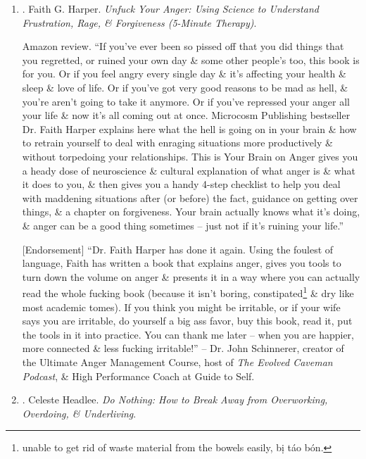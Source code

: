 \documentclass{article}
\begin{document}
\begin{enumerate}
	{\sf About the Author.} Dr. {\sc Faith G. Harper}, ACS, ACN, holds postdoctoral certifications in sexology \& applied clinical nutrition \& is trained in yoga, meditation, breathwork, mindful movement, \& all of those other forms of care that make most people avoid her at parties. In the past, she has worked in academia, community mental health, \& private practice as a licensed professional counselor. She maintains a connection with academia through he work with the Society of Indian Psychologists. She lives in San Antonio, TX, with her amazing friends \& family \& terrible rescue cats. She can be reached through her website, \url{faithgharper.com}.
	\item \cite{Harper_unfuck_anger}. {\sc Faith G. Harper}. {\it Unfuck Your Anger: Using Science to Understand Frustration, Rage, \& Forgiveness (5-Minute Therapy)}.
	
	{\sf Amazon review.} ``If you've ever been so pissed off that you did things that you regretted, or ruined your own day \& some other people's too, this book is for you. Or if you feel angry every single day \& it's affecting your health \& sleep \& love of life. Or if you've got very good reasons to be mad as hell, \& you're aren't going to take it anymore. Or if you've repressed your anger all your life \& now it's all coming out at once. Microcosm Publishing bestseller Dr. {\sc Faith Harper} explains here what the hell is going on in your brain \& how to retrain yourself to deal with enraging situations more productively \& without torpedoing your relationships. This is Your Brain on Anger gives you a heady dose of neuroscience \& cultural explanation of what anger is \& what it does to you, \& then gives you a handy 4-step checklist to help you deal with maddening situations after (or before) the fact, guidance on getting over things, \& a chapter on forgiveness. Your brain actually knows what it's doing, \& anger can be a good thing sometimes -- just not if it's ruining your life.''
	
	[Endorsement] ``Dr. {\sc Faith Harper} has done it again. Using the foulest of language, Faith has written a book that explains anger, gives you tools to turn down the volume on anger \& presents it in a way where you can actually read the whole fucking book (because it isn't boring, constipated\footnote{unable to get rid of waste material from the bowels easily, bị táo bón.} \& dry like most academic tomes). If you think you might be irritable, or if your wife says you are irritable, do yourself a big ass favor, buy this book, read it, put the tools in it into practice. You can thank me later -- when you are happier, more connected \& less fucking irritable!'' -- Dr. {\sc John Schinnerer}, creator of the Ultimate Anger Management Course, host of {\it The Evolved Caveman Podcast}, \& High Performance Coach at Guide to Self.
	\item \cite{Headlee_do_nothing}. {\sc Celeste Headlee}. {\it Do Nothing: How to Break Away from Overworking, Overdoing, \& Underliving}. {}
	

\end{enumerate}
\end{document}
